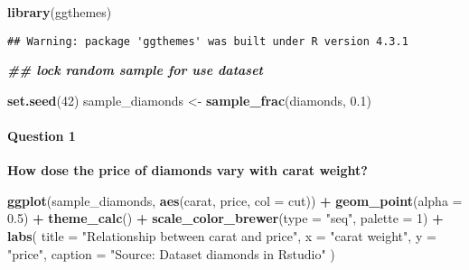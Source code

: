\documentclass[
]{article}
\newenvironment{Shaded}{\begin{snugshade}}{\end{snugshade}}
\newcommand{\AttributeTok}[1]{\textcolor[rgb]{0.13,0.29,0.53}{#1}}
\newcommand{\DecValTok}[1]{\textcolor[rgb]{0.00,0.00,0.81}{#1}}
\newcommand{\DocumentationTok}[1]{\textcolor[rgb]{0.56,0.35,0.01}{\textbf{\textit{#1}}}}
\newcommand{\FloatTok}[1]{\textcolor[rgb]{0.00,0.00,0.81}{#1}}
\newcommand{\FunctionTok}[1]{\textcolor[rgb]{0.13,0.29,0.53}{\textbf{#1}}}
\newcommand{\NormalTok}[1]{#1}
\newcommand{\OtherTok}[1]{\textcolor[rgb]{0.56,0.35,0.01}{#1}}
\newcommand{\SpecialCharTok}[1]{\textcolor[rgb]{0.81,0.36,0.00}{\textbf{#1}}}
\newcommand{\StringTok}[1]{\textcolor[rgb]{0.31,0.60,0.02}{#1}}
\begin{document}
\begin{Shaded}
\begin{Highlighting}[]
\FunctionTok{library}\NormalTok{(ggthemes)}
\end{Highlighting}
\end{Shaded}

\begin{verbatim}
## Warning: package 'ggthemes' was built under R version 4.3.1
\end{verbatim}

\begin{Shaded}
\begin{Highlighting}[]
\DocumentationTok{\#\# lock random sample for use dataset}

\FunctionTok{set.seed}\NormalTok{(}\DecValTok{42}\NormalTok{)}
\NormalTok{sample\_diamonds }\OtherTok{\textless{}{-}} \FunctionTok{sample\_frac}\NormalTok{(diamonds, }\FloatTok{0.1}\NormalTok{)}
\end{Highlighting}
\end{Shaded}

\hypertarget{question-1}{%
\paragraph{\texorpdfstring{\textbf{Question
1}}{Question 1}}\label{question-1}}

\textbf{How dose the price of diamonds vary with carat weight?}

\begin{Shaded}
\begin{Highlighting}[]
\FunctionTok{ggplot}\NormalTok{(sample\_diamonds, }\FunctionTok{aes}\NormalTok{(carat, price, }\AttributeTok{col =}\NormalTok{ cut)) }\SpecialCharTok{+}
  \FunctionTok{geom\_point}\NormalTok{(}\AttributeTok{alpha  =} \FloatTok{0.5}\NormalTok{) }\SpecialCharTok{+}
  \FunctionTok{theme\_calc}\NormalTok{() }\SpecialCharTok{+}
  \FunctionTok{scale\_color\_brewer}\NormalTok{(}\AttributeTok{type =} \StringTok{"seq"}\NormalTok{,}
                     \AttributeTok{palette =} \DecValTok{1}\NormalTok{) }\SpecialCharTok{+}
  \FunctionTok{labs}\NormalTok{(}
    \AttributeTok{title =} \StringTok{"Relationship between carat and price"}\NormalTok{,}
    \AttributeTok{x =} \StringTok{"carat weight"}\NormalTok{,}
    \AttributeTok{y =} \StringTok{"price"}\NormalTok{,}
    \AttributeTok{caption =} \StringTok{"Source: Dataset diamonds in Rstudio"}
\NormalTok{  )}
\end{Highlighting}
\end{Shaded}
\end{document}
